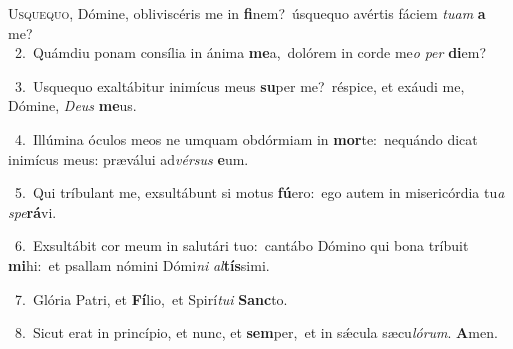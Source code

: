 \lettrine{\initial\textcolor{\initialcolor}{U}}{squequo,} Dómine, obliviscéris me in \textbf{fi}\-nem?~\star úsquequo avértis fáciem \textit{tu}\-\textit{am} \textbf{a} me?\\
{\numbfont\textcolor{\numbcolor}{~2.}}~Quámdiu ponam consília in ánima \textbf{me}\-a,~\star dolórem in corde me\textit{o} \textit{per} \textbf{di}\-em?\par
{\numbfont\textcolor{\numbcolor}{~3.}}~Usquequo exaltábitur inimícus meus \textbf{su}\-per me?~\star réspice, et exáudi me, Dómine, \textit{De}\-\textit{us} \textbf{me}\-us.\par
{\numbfont\textcolor{\numbcolor}{~4.}}~Illúmina óculos meos ne umquam obdórmiam in \textbf{mor}\-te:~\star nequándo dicat inimícus meus: præválui ad\-\textit{vér}\-\textit{sus} \textbf{e}\-um.\par
{\numbfont\textcolor{\numbcolor}{~5.}}~Qui tríbulant me, exsultábunt si motus \textbf{fú}\-ero:~\star ego autem in misericórdia tu\textit{a} \textit{spe}\-\textbf{rá}vi.\par
{\numbfont\textcolor{\numbcolor}{~6.}}~Exsultábit cor meum in salutári tuo:~\dagger cantábo Dómino qui bona tríbuit \textbf{mi}\-hi:~\star et psallam nómini Dómi\textit{ni} \textit{al}\-\textbf{tís}simi.\par
{\numbfont\textcolor{\numbcolor}{~7.}}~Glória Patri, et \textbf{Fí}\-lio,~\star et Spirí\-\textit{tu}\-\textit{i} \textbf{Sanc}\-to.\par
{\numbfont\textcolor{\numbcolor}{~8.}}~Sicut erat in princípio, et nunc, et \textbf{sem}\-per,~\star et in sǽcula sæcu\-\textit{ló}\-\textit{rum}. \textbf{A}\-men.\par

